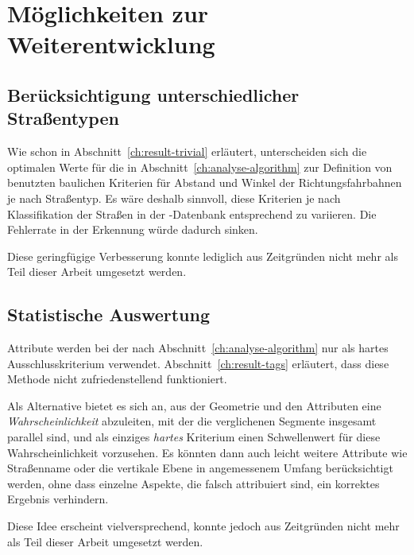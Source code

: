 \documentclass[../main/thesis.tex]{subfiles}
\begin{document}
\section{Möglichkeiten zur Weiterentwicklung}
\label{ch:improvements}



\subsection{Berücksichtigung unterschiedlicher Straßentypen}

Wie schon in Abschnitt~\ref{ch:result-trivial} erläutert, unterscheiden sich die optimalen Werte für die in Abschnitt~\ref{ch:analyse-algorithm} zur Definition von  benutzten baulichen Kriterien für Abstand und Winkel der Richtungsfahrbahnen je nach Straßentyp.
Es wäre deshalb sinnvoll, diese Kriterien je nach Klassifikation der Straßen in der \osm-Datenbank entsprechend zu variieren.
Die Fehlerrate in der Erkennung würde dadurch sinken.

Diese geringfügige Verbesserung konnte lediglich aus Zeitgründen nicht mehr als Teil dieser Arbeit umgesetzt werden.



\subsection{Statistische Auswertung}
\label{ch:improvements-stats}

Attribute werden bei der  nach Abschnitt~\ref{ch:analyse-algorithm} nur als hartes Ausschlusskriterium verwendet.
Abschnitt~\ref{ch:result-tags} erläutert, dass diese Methode nicht zufriedenstellend funktioniert.

Als Alternative bietet es sich an, aus der Geometrie und den Attributen eine \emph{Wahrscheinlichkeit} abzuleiten, mit der die verglichenen Segmente insgesamt parallel sind, und als einziges \emph{hartes} Kriterium einen Schwellenwert für diese Wahrscheinlichkeit vorzusehen.
Es könnten dann auch leicht weitere Attribute wie Straßenname oder die vertikale Ebene in angemessenem Umfang berücksichtigt werden, ohne dass einzelne Aspekte, die falsch attribuiert sind, ein korrektes Ergebnis verhindern.

Diese Idee erscheint vielversprechend, konnte jedoch aus Zeitgründen nicht mehr als Teil dieser Arbeit umgesetzt werden.

\end{document}
